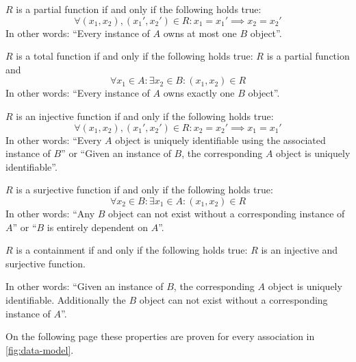 \begin{description}[labelwidth=\linewidth, listparindent=0pt]
    \item[Partial function]\label{def:partial}
        $R$ is a partial function if and only if the following holds true:
        $$\forall (x_1, x_2), (x_1', x_2')\in R : x_1 = x_1' \implies x_2 = x_2'$$
        In other words: \enquote{Every instance of $A$ owns at most one $B$ object}.
    \item[Total function]\label{def:total}
        $R$ is a total function if and only if the following holds true: $R$ is a partial function and
        $$\forall x_1 \in A: \exists x_2 \in B: (x_1, x_2) \in R$$
        In other words: \enquote{Every instance of $A$ owns exactly one $B$ object}.
    \item[Injective function]\label{def:injective}
        $R$ is an injective function if and only if the following holds true:
        $$\forall (x_1, x_2), (x_1', x_2')\in R : x_2 = x_2' \implies x_1 = x_1'$$
        In other words: \enquote{Every $A$ object is uniquely identifiable using the associated instance of $B$} or \enquote{Given an instance of $B$, the corresponding $A$ object is uniquely identifiable}.
    \item[Surjective function]\label{def:surjective}
        $R$ is a surjective function if and only if the following holds true:
        $$\forall x_2 \in B: \exists x_1 \in A: (x_1, x_2) \in R$$
        In other words: \enquote{Any $B$ object can not exist without a corresponding instance of $A$} or \enquote{$B$ is entirely dependent on $A$}. 
    \item[Containment]\label{def:containment}
        $R$ is a containment if and only if the following holds true: $R$ is an injective and surjective function.
        
        In other words: \enquote{Given an instance of $B$, the corresponding $A$ object is uniquely identifiable. Additionally the $B$ object can not exist without a corresponding instance of $A$}.
\end{description}

On the following page these properties are proven for every association in \cref{fig:data-model}.

\pagebreak

